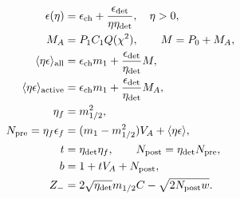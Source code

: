 \begin{align}
\epsilon(\eta)&=\epsilon_{\rm ch}+\frac{\epsilon_{\rm det}}{\eta\eta_{\rm det}},\quad \eta>0,\\
M_A&=P_1 C_1 Q(\chi^2),\qquad M=P_0+M_A,\\
\langle\eta\epsilon\rangle_{\rm all}
 &=\epsilon_{\rm ch}m_1+\frac{\epsilon_{\rm det}}{\eta_{\rm det}}M,\\
\langle\eta\epsilon\rangle_{\rm active}
 &=\epsilon_{\rm ch}m_1+\frac{\epsilon_{\rm det}}{\eta_{\rm det}}M_A,\\
\eta_f&=m_{1/2}^2,\\
N_{\rm pre}=\eta_f\epsilon_f
 &=(m_1-m_{1/2}^2)V_A+\langle\eta\epsilon\rangle,\\
t&=\eta_{\rm det}\eta_f,\qquad N_{\rm post}=\eta_{\rm det}N_{\rm pre},\\
b&=1+tV_A+N_{\rm post},\\
Z_-&=2\sqrt{\eta_{\rm det}}m_{1/2}C-\sqrt{2N_{\rm post}w}.
\end{align}
